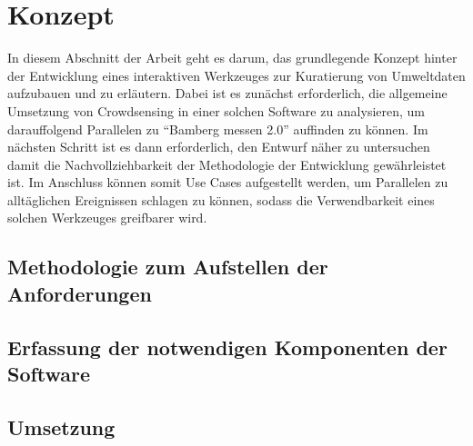 \chapter{Konzept} %
In diesem Abschnitt der Arbeit geht es darum, das grundlegende Konzept hinter der Entwicklung eines interaktiven Werkzeuges zur Kuratierung 
von Umweltdaten aufzubauen und zu erläutern. Dabei ist es zunächst erforderlich, die allgemeine Umsetzung von Crowdsensing in einer solchen Software zu analysieren, um 
darauffolgend Parallelen zu \enquote{Bamberg messen 2.0} auffinden zu können. \newline Im nächsten Schritt ist es dann erforderlich, den Entwurf näher zu untersuchen damit 
die Nachvollziehbarkeit der Methodologie der Entwicklung gewährleistet ist. Im Anschluss können somit Use Cases aufgestellt werden, um Parallelen zu alltäglichen Ereignissen 
schlagen zu können, sodass die Verwendbarkeit eines solchen Werkzeuges greifbarer wird.
\section{Methodologie zum Aufstellen der Anforderungen}

\section{Erfassung der notwendigen Komponenten der Software}

\section{Umsetzung}
